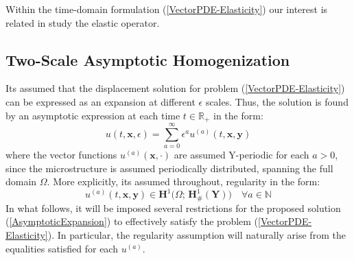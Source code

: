 Within the time-domain formulation (\ref{VectorPDE-Elasticity}) our interest is related in study the elastic operator. 


\subsection{Two-Scale Asymptotic Homogenization}
Its assumed that the displacement solution for problem (\ref{VectorPDE-Elasticity}) can be expressed as an expansion at different $\epsilon$ scales. Thus, the solution is found by an asymptotic expression at each time $t \in \mathbb{R}_+$ in the form:
\begin{equation*}
    \label{AsymptoticExpansion}
    u(t, \mathbf{x},\epsilon) = \sum_{a=0}^{\infty} \epsilon^a u^{(a)}(t, \mathbf{x},\mathbf{y}) 
\end{equation*}
where the vector functions $u^{(a)}(\mathbf{x}, \cdot)$ are assumed Y-periodic for each $a>0$, since the microstructure is assumed periodically distributed, spanning the full domain $\Omega$. More explicitly, its assumed throughout, regularity in the form:
\begin{equation*}
    u^{(a)}(t, \mathbf{x},\mathbf{y}) \in \mathbf{H}^1\big(\Omega; \, \mathbf{H}^1_{\#}(\mathbf{Y})\big) \quad \forall a \in \mathbb{N}
\end{equation*}
In what follows, it will be imposed several restrictions for the proposed solution (\ref{AsymptoticExpansion}) to effectively satisfy the problem (\ref{VectorPDE-Elasticity}). In particular, the regularity assumption will naturally arise from the equalities satisfied for each $u^{(a)}$.

